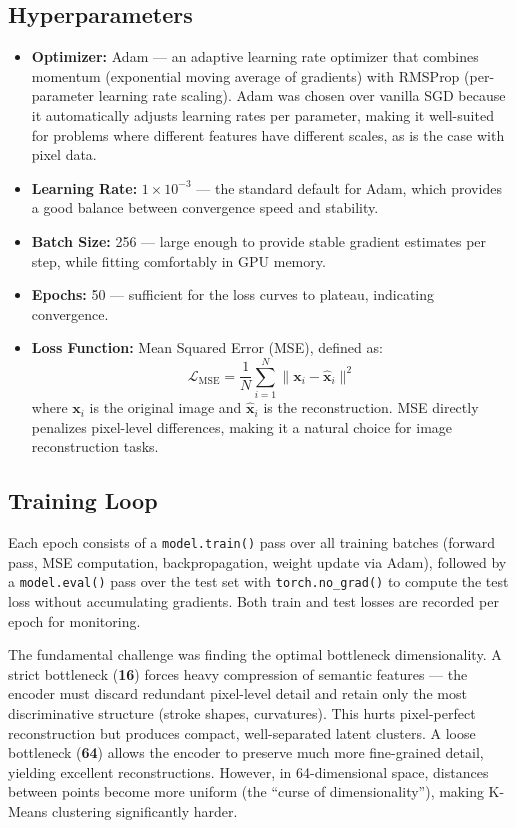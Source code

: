 \documentclass[12pt,a4paper]{article}
\begin{document}
\subsection{Hyperparameters}
\begin{itemize}
    \item \textbf{Optimizer:} \textcolor{accentblue}{Adam} — an adaptive learning rate optimizer that combines momentum (exponential moving average of gradients) with RMSProp (per-parameter learning rate scaling). Adam was chosen over vanilla SGD because it automatically adjusts learning rates per parameter, making it well-suited for problems where different features have different scales, as is the case with pixel data.
    \item \textbf{Learning Rate:} $1 \times 10^{-3}$ — the standard default for Adam, which provides a good balance between convergence speed and stability.
    \item \textbf{Batch Size:} 256 — large enough to provide stable gradient estimates per step, while fitting comfortably in GPU memory.
    \item \textbf{Epochs:} 50 — sufficient for the loss curves to plateau, indicating convergence.
    \item \textbf{Loss Function:} \textcolor{accentblue}{Mean Squared Error (MSE)}, defined as:
    \[
    \mathcal{L}_{\text{MSE}} = \frac{1}{N} \sum_{i=1}^{N} \| \mathbf{x}_i - \hat{\mathbf{x}}_i \|^2
    \]
    where $\mathbf{x}_i$ is the original image and $\hat{\mathbf{x}}_i$ is the reconstruction. MSE directly penalizes pixel-level differences, making it a natural choice for image reconstruction tasks.
\end{itemize}

\subsection{Training Loop}
Each epoch consists of a \texttt{model.train()} pass over all training batches (forward pass, MSE computation, backpropagation, weight update via Adam), followed by a \texttt{model.eval()} pass over the test set with \texttt{torch.no\_grad()} to compute the test loss without accumulating gradients. Both train and test losses are recorded per epoch for monitoring.

\begin{tcolorbox}[colback=lightgray, colframe=accentorange, title={\color{white}\textbf{Challenge Analysis}}, fonttitle=\bfseries, coltitle=white]
The fundamental challenge was finding the optimal bottleneck dimensionality. A strict bottleneck (\textcolor{deepblue}{\textbf{16}}) forces heavy compression of semantic features — the encoder must discard redundant pixel-level detail and retain only the most discriminative structure (stroke shapes, curvatures). This hurts pixel-perfect reconstruction but produces compact, well-separated latent clusters. A loose bottleneck (\textcolor{deepblue}{\textbf{64}}) allows the encoder to preserve much more fine-grained detail, yielding excellent reconstructions. However, in 64-dimensional space, distances between points become more uniform (the ``curse of dimensionality''), making K-Means clustering significantly harder.
\end{tcolorbox}
\end{document}
